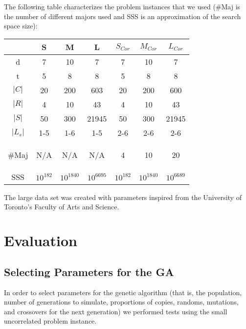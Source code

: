 \documentclass[letterpaper]{article}
\begin{document}
      The following table characterizes the problem instances that we used ($\#$Maj is the 
      number of different majors used and \textsc{SSS} is an approximation of the search space size):    
      \begin{center}
      \begin{small}
      \begin{tabular}{*{7}{c}}
      \hline 
      	& S 	& M 	& L 	& $S_{Cor}$ & $M_{Cor}$ & $L_{Cor}$ \\ 
      \hline \hline
       d 		& 7 	& 10	& 7 	& 7 	& 10 	& 7 	\\ 
       t 		& 5		& 8 	& 8 	& 5 	& 8 	& 8 	\\ 
       $|C|$	& 20 	& 200 	& 603 	& 20 	& 200 	& 600 	\\ 
       $|R|$	& 4 	& 10 	& 43 	& 4 	& 10 	& 43	\\ 
       $|S|$	& 50 	& 300 	& 21945 & 50 	& 300 	& 21945	\\ 
       $|L_s|$	& 1-5 	& 1-6 	& 1-5 	& 2-6 	& 2-6 	& 2-6 	\\ 
       \begin{tiny}$\#$Maj\end{tiny}	& N/A 	& N/A 	& N/A 	& 4 	& 10 	& 20 	\\ 
       \textsc{SSS}	& $10^{182}$ & $10^{1840}$ & $10^{6695}$ & $10^{182}$ & $10^{1840}$ & $10^{6689}$ \\
      \hline 
	  \end{tabular} 
	  \end{small}
	  \end{center}
	  
	  The large data set was created with parameters inspired from the University of 
	  Toronto's Faculty of Arts and Science.
	  
\section{Evaluation}
   \subsection{Selecting Parameters for the GA}
      In order to select parameters for the genetic algorithm (that is, the population, 
      number of generations to simulate, proportions of copies, randoms, mutations, and 
      crossovers for the next generation) we performed tests using the small uncorrelated 
      problem instance.
      
\end{document}
